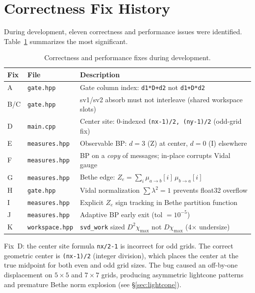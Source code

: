 \documentclass[11pt]{article}
\newcommand{\chimax}{\chi_{\mathrm{max}}}
\begin{document}
\appendix

\section{Correctness Fix History}
\label{sec:fixes}

During development, eleven correctness and performance issues were identified.
Table~\ref{tab:fixes} summarizes the most significant.

\begin{table}[ht]
\centering
\caption{Correctness and performance fixes during development.}
\label{tab:fixes}
\begin{tabular}{lll}
\toprule
Fix & File & Description \\
\midrule
A & \texttt{gate.hpp}     & Gate column index: \texttt{d1*D+d2} not \texttt{d1+D*d2} \\
B/C & \texttt{gate.hpp}   & sv1/sv2 absorb must not interleave (shared workspace slots) \\
D & \texttt{main.cpp}     & Center site: 0-indexed \texttt{(nx-1)/2, (ny-1)/2} (odd-grid fix) \\
E & \texttt{measures.hpp} & Observable BP: $d=3$ (Z) at center, $d=0$ (I) elsewhere \\
F & \texttt{measures.hpp} & BP on a \emph{copy} of messages; in-place corrupts Vidal gauge \\
G & \texttt{measures.hpp} & Bethe edge: $Z_e = \sum_i \mu_{a\to b}[i]\,\mu_{b\to a}[i]$ \\
H & \texttt{gate.hpp}     & Vidal normalization $\sum\lambda^2=1$ prevents float32 overflow \\
I & \texttt{measures.hpp} & Explicit $Z_e$ sign tracking in Bethe partition function \\
J & \texttt{measures.hpp} & Adaptive BP early exit (tol $= 10^{-5}$) \\
K & \texttt{workspace.hpp}& \texttt{svd\_work} sized $D^2\chimax$ not $D\chimax$ (4$\times$ undersize) \\
\bottomrule
\end{tabular}
\end{table}

Fix~D: the center site formula \texttt{nx/2-1} is incorrect for odd grids.
The correct geometric center is \texttt{(nx-1)/2} (integer division), which
places the center at the true midpoint for both even and odd grid sizes.
The bug caused an off-by-one displacement on $5\times5$ and $7\times7$ grids,
producing asymmetric lightcone patterns and premature Bethe norm explosion
(see \S\ref{sec:lightcone}).
\end{document}
